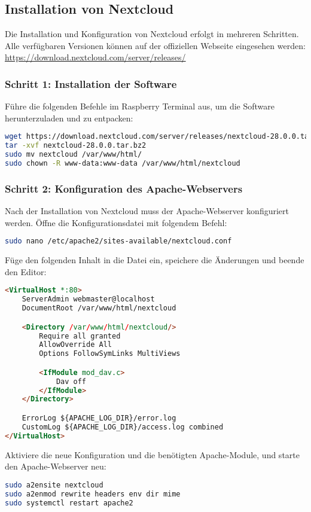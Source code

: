 \documentclass[a4paper,12pt]{article}
\begin{document}
\subsection{Installation von Nextcloud}
Die Installation und Konfiguration von Nextcloud erfolgt in mehreren Schritten. Alle verfügbaren Versionen können auf der offiziellen Webseite eingesehen werden:  
\url{https://download.nextcloud.com/server/releases/}

\subsubsection{Schritt 1: Installation der Software}
Führe die folgenden Befehle im Raspberry Terminal aus, um die Software herunterzuladen und zu entpacken:
\begin{lstlisting}[language=bash]
wget https://download.nextcloud.com/server/releases/nextcloud-28.0.0.tar.bz2
tar -xvf nextcloud-28.0.0.tar.bz2
sudo mv nextcloud /var/www/html/
sudo chown -R www-data:www-data /var/www/html/nextcloud
\end{lstlisting}

\subsubsection{Schritt 2: Konfiguration des Apache-Webservers}
Nach der Installation von Nextcloud muss der Apache-Webserver konfiguriert werden. Öffne die Konfigurationsdatei mit folgendem Befehl:
\begin{lstlisting}[language=bash]
sudo nano /etc/apache2/sites-available/nextcloud.conf
\end{lstlisting}
Füge den folgenden Inhalt in die Datei ein, speichere die Änderungen und beende den Editor:
\begin{lstlisting}[language=html]
<VirtualHost *:80>
    ServerAdmin webmaster@localhost
    DocumentRoot /var/www/html/nextcloud

    <Directory /var/www/html/nextcloud/>
        Require all granted
        AllowOverride All
        Options FollowSymLinks MultiViews

        <IfModule mod_dav.c>
            Dav off
        </IfModule>
    </Directory>

    ErrorLog ${APACHE_LOG_DIR}/error.log
    CustomLog ${APACHE_LOG_DIR}/access.log combined
</VirtualHost>
\end{lstlisting}

Aktiviere die neue Konfiguration und die benötigten Apache-Module, und starte den Apache-Webserver neu:
\begin{lstlisting}[language=bash]
sudo a2ensite nextcloud
sudo a2enmod rewrite headers env dir mime
sudo systemctl restart apache2
\end{lstlisting}
\end{document}
